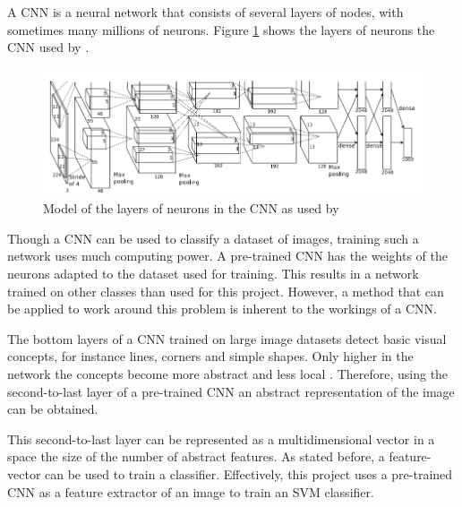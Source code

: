 A CNN is a neural network that consists of several layers of nodes, with sometimes many millions of neurons.
Figure \ref{fig:cnn-alex} shows the layers of neurons the CNN used by \citeauthor{krizhevsky2012imagenet}.

\begin{figure}[h!tb]
\centering
\ifx\showfig\undefined
\includegraphics[keepaspectratio=true,width=\textwidth]{images/alexnet2012.png} \fi
\caption{Model of the layers of neurons in the CNN as used by \citet{krizhevsky2012imagenet}}
\label{fig:cnn-alex}
\end{figure}

Though a CNN can be used to classify a dataset of images, training such a network uses much computing power.
A pre-trained CNN has the weights of the neurons adapted to the dataset used for training.
This results in a network trained on other classes than used for this project.
However, a method that can be applied to work around this problem is inherent to the workings of a CNN.


The bottom layers of a CNN trained on large image datasets detect basic visual concepts, for instance lines, corners and simple shapes.
Only higher in the network the concepts become more abstract and less local \citep{zeiler2014visualizing}.
Therefore, using the second-to-last layer of a pre-trained CNN an abstract representation of the image can be obtained.

This second-to-last layer can be represented as a multidimensional vector in a space the size of the number of abstract features.
As stated before, a feature-vector can be used to train a classifier.
Effectively, this project uses a pre-trained CNN as a feature extractor of an image to train an SVM classifier.

